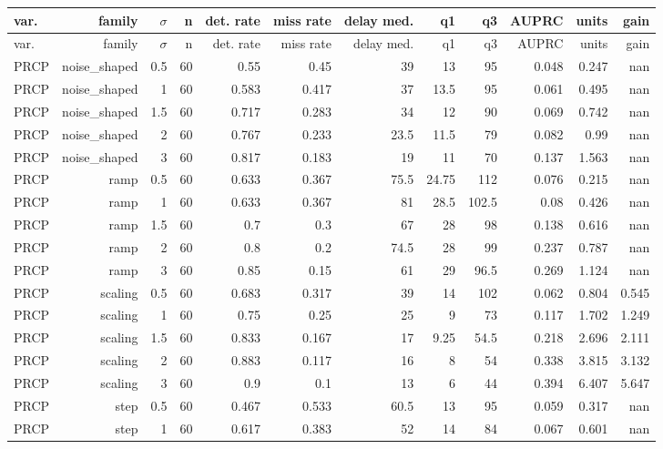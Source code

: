 \documentclass[10pt,a4paper]{article}
\begin{document}
{\small
\setlength{\tabcolsep}{2pt}
\setlength{\LTleft}{\fill}
\setlength{\LTright}{\fill}
\begin{longtable}{lrrrrrrrrrrr}
\toprule
var. & family & $\sigma$ & n & det. rate & miss rate & delay med. & q1 & q3 & AUPRC & units & gain \\
\midrule
\endfirsthead
\toprule
var. & family & $\sigma$ & n & det. rate & miss rate & delay med. & q1 & q3 & AUPRC & units & gain \\
\midrule
\endhead
\bottomrule
\endlastfoot
PRCP & noise\_\allowbreak{}shaped & 0.5 & 60 & 0.55 & 0.45 & 39 & 13 & 95 & 0.048 & 0.247 & nan \\
PRCP & noise\_\allowbreak{}shaped & 1 & 60 & 0.583 & 0.417 & 37 & 13.5 & 95 & 0.061 & 0.495 & nan \\
PRCP & noise\_\allowbreak{}shaped & 1.5 & 60 & 0.717 & 0.283 & 34 & 12 & 90 & 0.069 & 0.742 & nan \\
PRCP & noise\_\allowbreak{}shaped & 2 & 60 & 0.767 & 0.233 & 23.5 & 11.5 & 79 & 0.082 & 0.99 & nan \\
PRCP & noise\_\allowbreak{}shaped & 3 & 60 & 0.817 & 0.183 & 19 & 11 & 70 & 0.137 & 1.563 & nan \\
PRCP & ramp & 0.5 & 60 & 0.633 & 0.367 & 75.5 & 24.75 & 112 & 0.076 & 0.215 & nan \\
PRCP & ramp & 1 & 60 & 0.633 & 0.367 & 81 & 28.5 & 102.5 & 0.08 & 0.426 & nan \\
PRCP & ramp & 1.5 & 60 & 0.7 & 0.3 & 67 & 28 & 98 & 0.138 & 0.616 & nan \\
PRCP & ramp & 2 & 60 & 0.8 & 0.2 & 74.5 & 28 & 99 & 0.237 & 0.787 & nan \\
PRCP & ramp & 3 & 60 & 0.85 & 0.15 & 61 & 29 & 96.5 & 0.269 & 1.124 & nan \\
PRCP & scaling & 0.5 & 60 & 0.683 & 0.317 & 39 & 14 & 102 & 0.062 & 0.804 & 0.545 \\
PRCP & scaling & 1 & 60 & 0.75 & 0.25 & 25 & 9 & 73 & 0.117 & 1.702 & 1.249 \\
PRCP & scaling & 1.5 & 60 & 0.833 & 0.167 & 17 & 9.25 & 54.5 & 0.218 & 2.696 & 2.111 \\
PRCP & scaling & 2 & 60 & 0.883 & 0.117 & 16 & 8 & 54 & 0.338 & 3.815 & 3.132 \\
PRCP & scaling & 3 & 60 & 0.9 & 0.1 & 13 & 6 & 44 & 0.394 & 6.407 & 5.647 \\
PRCP & step & 0.5 & 60 & 0.467 & 0.533 & 60.5 & 13 & 95 & 0.059 & 0.317 & nan \\
PRCP & step & 1 & 60 & 0.617 & 0.383 & 52 & 14 & 84 & 0.067 & 0.601 & nan \\

\end{longtable}}
\end{document}
